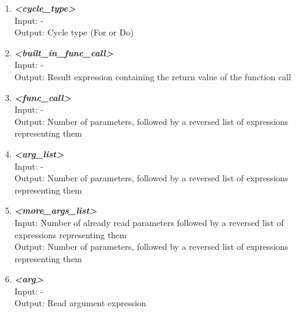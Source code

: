 \documentclass[a4paper, 11pt]{article}
\begin{document}
\begin{enumerate}
\item \textbf{\textit{<cycle\_type>}} \\
Input: \hspace{3.288mm} -  \\
Output: \enspace Cycle type (For or Do)

\item \textbf{\textit{<built\_in\_func\_call>}} \\
Input: \hspace{3.288mm} -  \\
Output: \enspace Result expression containing the return value of the function call

\item \textbf{\textit{<func\_call>}} \\
Input: \hspace{3.288mm} -  \\
Output: \enspace Number of parameters, followed by a reversed list of expressions representing them

\item \textbf{\textit{<arg\_list>}} \\
Input: \hspace{3.288mm} -  \\
Output: \enspace Number of parameters, followed by a reversed list of expressions representing them

\item \textbf{\textit{<more\_args\_list>}} \\
Input: \hspace{3.288mm} Number of already read parameters followed by a reversed list of expressions representing them  \\
Output: \enspace Number of parameters, followed by a reversed list of expressions representing them

\item \textbf{\textit{<arg>}} \\
Input: \hspace{3.288mm} -  \\
Output: \enspace Read argument expression
\end{enumerate}

\end{document}

